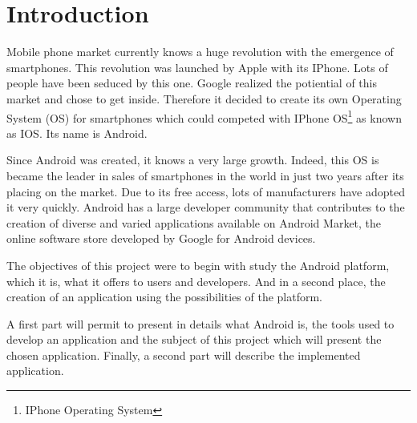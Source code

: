 \chapter{Introduction}

Mobile phone market currently knows a huge revolution with the emergence of smartphones.
This revolution was launched by Apple with its IPhone. Lots of people have been seduced by this one.
Google realized the potiential of this market and chose to get inside.
Therefore it decided to create its own Operating System (OS) for smartphones which could competed with IPhone OS\protect\footnote{IPhone Operating System} as known as IOS.
Its name is Android.

Since Android was created, it knows a very large growth.
Indeed, this OS is became the leader in sales of smartphones in the world in just two years after its placing on the market.
Due to its free access, lots of manufacturers have adopted it very quickly.
Android has a large developer community that contributes to the creation of diverse and varied applications available on Android Market, the online software store developed by Google for Android devices.

The objectives of this project were to begin with study the Android platform, which it is, what it offers to users and developers.
And in a second place, the creation of an application using the possibilities of the platform.

A first part will permit to present in details what Android is, the tools used to develop an application and the subject of this project which will present the chosen application.
Finally, a second part will describe the implemented application.

\clearpage
